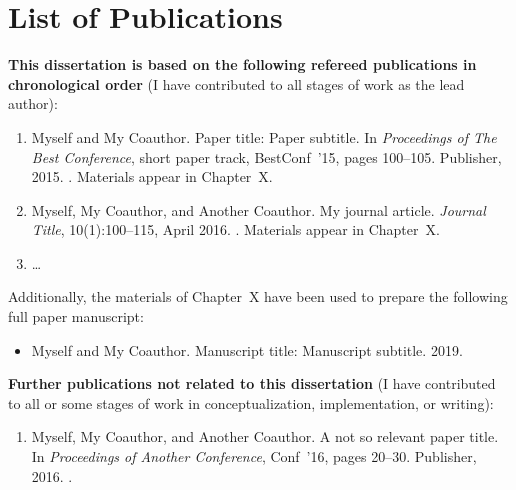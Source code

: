 \chapter*{List of Publications}

\textbf{This dissertation is based on the following refereed publications in chronological order} 
(I have contributed to all stages of work as the lead author):
\begin{enumerate}
\item Myself and My Coauthor. 
Paper title: Paper subtitle. 
In {\em Proceedings of The Best Conference}, short paper track, BestConf~'15, pages 100--105. Publisher, 2015. 
\href{https://doi.org/xxx}{}. 
Materials appear in Chapter~X.

\item Myself, My Coauthor, and Another Coauthor. 
My journal article. 
{\em Journal Title}, 10(1):100--115, April 2016. 
\href{https://doi.org/yyy}{}. 
Materials appear in Chapter~X.

\item \ldots
\end{enumerate}

\noindent Additionally, the materials of Chapter~X have been used to prepare the following full paper manuscript:
\begin{itemize}
\item Myself and My Coauthor. 
Manuscript title: Manuscript subtitle.
2019. 
\end{itemize}

\newpage

\noindent\textbf{Further publications not related to this dissertation}
(I have contributed to all or some stages of work in conceptualization, implementation, or writing):
\begin{enumerate}
\item Myself, My Coauthor, and Another Coauthor. 
A not so relevant paper title. 
In {\em Proceedings of Another Conference}, Conf~'16, pages 20--30. Publisher, 2016. 
\href{https://doi.org/zzz}{}. 
\end{enumerate}
